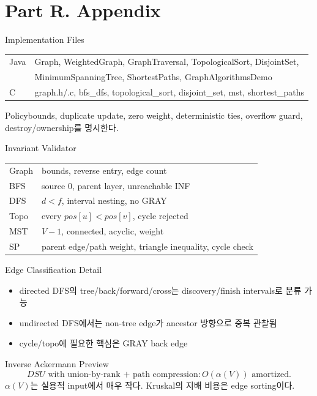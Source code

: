 \section{Part R. Appendix}
\begin{frame}{Implementation Files}
\scriptsize\begin{tabular}{ll}\toprule
Java&Graph, WeightedGraph, GraphTraversal, TopologicalSort, DisjointSet,\\
&MinimumSpanningTree, ShortestPaths, GraphAlgorithmsDemo\\
C&graph.h/.c, bfs\_dfs, topological\_sort, disjoint\_set, mst, shortest\_paths\\\bottomrule
\end{tabular}
\begin{block}{Policy}bounds, duplicate update, zero weight, deterministic ties, overflow guard, destroy/ownership를 명시한다.\end{block}
\end{frame}
\begin{frame}{Invariant Validator}
\scriptsize\begin{tabular}{ll}\toprule
Graph&bounds, reverse entry, edge count\\
BFS&source 0, parent layer, unreachable INF\\
DFS&\(d<f\), interval nesting, no GRAY\\
Topo&every \(pos[u]<pos[v]\), cycle rejected\\
MST&\(V-1\), connected, acyclic, weight\\
SP&parent edge/path weight, triangle inequality, cycle check\\\bottomrule
\end{tabular}
\end{frame}
\begin{frame}{Edge Classification Detail}
\begin{itemize}\item directed DFS의 tree/back/forward/cross는 discovery/finish intervals로 분류 가능\item undirected DFS에서는 non-tree edge가 ancestor 방향으로 중복 관찰됨\item cycle/topo에 필요한 핵심은 GRAY back edge\end{itemize}
\end{frame}
\begin{frame}{Inverse Ackermann Preview}
\[
DSU\text{ with union-by-rank + path compression}: O(\alpha(V))\text{ amortized}.
\]
\(\alpha(V)\)는 실용적 input에서 매우 작다. Kruskal의 지배 비용은 edge sorting이다.
\end{frame}
